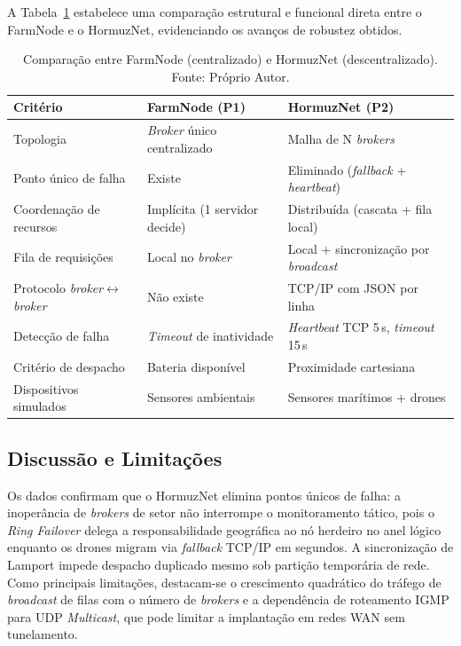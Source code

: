A Tabela~\ref{tab:comparacao} estabelece uma comparação estrutural e funcional direta entre o FarmNode e o HormuzNet, evidenciando os avanços de robustez obtidos.

\begin{table}[ht]
  \centering
  \sloppy
  \caption{Comparação entre FarmNode (centralizado) e HormuzNet (descentralizado). Fonte: Próprio Autor.}
  \label{tab:comparacao}
  \begin{tabular}{p{3.8cm}p{4.8cm}p{4.8cm}}
    \toprule
    \textbf{Critério} & \textbf{FarmNode (P1)} & \textbf{HormuzNet (P2)} \\
    \midrule
    Topologia & \textit{Broker} único centralizado & Malha de N \textit{brokers} \\
    Ponto único de falha & Existe & Eliminado (\textit{fallback} + \textit{heartbeat}) \\
    Coordenação de recursos & Implícita (1 servidor decide) & Distribuída (cascata + fila local) \\
    Fila de requisições & Local no \textit{broker} & Local + sincronização por \textit{broadcast} \\
    Protocolo \textit{broker}$\leftrightarrow$\textit{broker} & Não existe & TCP/IP com JSON por linha \\
    Detecção de falha & \textit{Timeout} de inatividade & \textit{Heartbeat} TCP 5\,s, \textit{timeout} 15\,s \\
    Critério de despacho & Bateria disponível & Proximidade cartesiana \\
    Dispositivos simulados & Sensores ambientais & Sensores marítimos + drones \\
    \bottomrule
  \end{tabular}
\end{table}

\subsection{Discussão e Limitações}
\label{sub:discussao_limitacoes}

Os dados confirmam que o HormuzNet elimina pontos únicos de falha: a inoperância de \textit{brokers} de setor não interrompe o monitoramento tático, pois o \textit{Ring Failover} delega a responsabilidade geográfica ao nó herdeiro no anel lógico enquanto os drones migram via \textit{fallback} TCP/IP em segundos. A sincronização de Lamport impede despacho duplicado mesmo sob partição temporária de rede. Como principais limitações, destacam-se o crescimento quadrático do tráfego de \textit{broadcast} de filas com o número de \textit{brokers} e a dependência de roteamento IGMP para UDP \textit{Multicast}, que pode limitar a implantação em redes WAN sem tunelamento.
